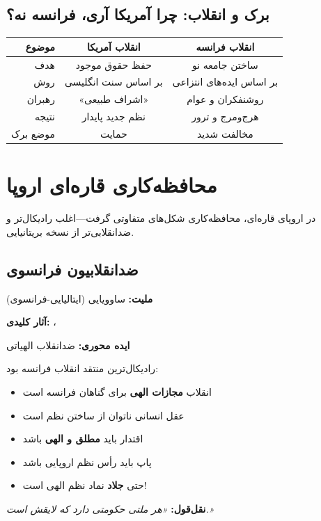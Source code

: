 \subsection{برک و انقلاب: چرا آمریکا آری، فرانسه نه؟}

\begin{comparebox}
\begin{table}[H]
\centering
\begin{tabular}{r|c|c}
\toprule
\textbf{موضوع} & \textbf{انقلاب آمریکا} & \textbf{انقلاب فرانسه} \\
\midrule
هدف & حفظ حقوق موجود & ساختن جامعه نو \\
روش & بر اساس سنت انگلیسی & بر اساس ایده‌های انتزاعی \\
رهبران & «اشراف طبیعی» & روشنفکران و عوام \\
نتیجه & نظم جدید پایدار & هرج‌ومرج و ترور \\
موضع برک & حمایت & مخالفت شدید \\
\bottomrule
\end{tabular}
\end{table}
\end{comparebox}

\section{محافظه‌کاری قاره‌ای اروپا}

در اروپای قاره‌ای، محافظه‌کاری شکل‌های متفاوتی گرفت—اغلب رادیکال‌تر و ضدانقلابی‌تر از نسخه بریتانیایی.

\subsection{ضدانقلابیون فرانسوی}

\begin{personbox}

\textbf{ملیت:} ساوویایی (ایتالیایی-فرانسوی)

\textbf{آثار کلیدی:} ، 

\textbf{ایده محوری:} ضدانقلاب الهیاتی

\mediumspace

 رادیکال‌ترین منتقد انقلاب فرانسه بود:

\begin{itemize}[nosep]
    \item انقلاب \textbf{مجازات الهی} برای گناهان فرانسه است
    \item عقل انسانی ناتوان از ساختن نظم است
    \item اقتدار باید \textbf{مطلق و الهی} باشد
    \item پاپ باید رأس نظم اروپایی باشد
    \item حتی \textbf{جلاد} نماد نظم الهی است!
\end{itemize}

\mediumspace

\textbf{نقل‌قول:} \textit{«هر ملتی حکومتی دارد که لایقش است.»}
\end{personbox}


